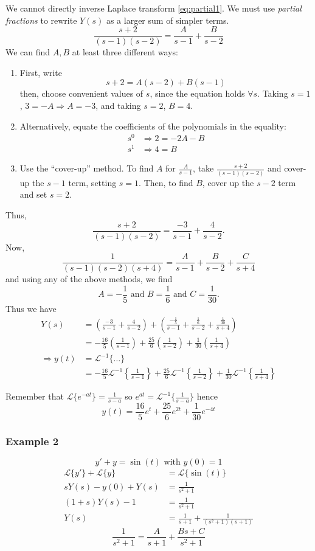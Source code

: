 \documentclass[11pt]{article}
\newcommand{\lap}{\mathcal{L}}
\newcommand{\lapi}{\lap^{-1}}
\begin{document}
	We cannot directly inverse Laplace transform \eqref{eq:partial1}. We must use \emph{partial fractions} to rewrite $Y(s)$ as a larger sum of simpler terms.
		$$ \frac{s+2}{(s-1)(s-2)} = \frac{A}{s-1} + \frac{B}{s-2} $$
	We can find $A,B$ at least three different ways:
		\begin{enumerate}
			\item First, write
				$$ s+2 = A(s-2) + B(s-1) $$
				then, choose convenient values of $s$, since the equation holds $\forall s$. Taking $s=1$, $3 = -A \Rightarrow A = -3$, and taking $s=2$, $B=4$.
			\item Alternatively, equate the coefficients of the polynomials in the equality:
				\begin{align*}
					s^0 &\Rightarrow 2 = -2 A - B \\
					s^1 &\Rightarrow 4 = B
				\end{align*}
			\item Use the ``cover-up'' method. To find $A$ for $\frac{A}{s-1}$, take $\frac{s+2}{(s-1)(s-2)}$ and cover-up the $s-1$ term, setting $s=1$. Then, to find $B$, cover up the $s-2$ term and set $s=2$.
		\end{enumerate}
	Thus,
		$$ \frac{s+2}{(s-1)(s-2)} = \frac{-3}{s-1} + \frac{4}{s-2}. $$
	Now,
		$$ \frac{1}{(s-1)(s-2)(s+4)} = \frac{A}{s-1} + \frac{B}{s-2} + \frac{C}{s+4} $$
	and using any of the above methods, we find
		$$ A = - \frac{1}{5} \text{ and } B = \frac{1}{6} \text{ and } C = \frac{1}{30} . $$
	Thus we have
		\begin{align*}
			Y(s) &= \left( \frac{-3}{s-1} + \frac{4}{s-2}\right) + \left(\frac{-\frac{1}{5}}{s-1} + \frac{\frac{1}{6}}{s-2} + \frac{\frac{1}{30}}{s+4}\right) \\
			&= - \frac{16}{5} \left(\frac{1}{s-1}\right) + \frac{25}{6} \left(\frac{1}{s-2}\right) + \frac{1}{30} \left(\frac{1}{s+4}\right) \\
			\Rightarrow y(t) &= \lapi\{\ldots\} \\
			&= - \frac{16}{5} \lapi \left\{\frac{1}{s-1}\right\} + \frac{25}{6} \lapi \left\{\frac{1}{s-2}\right\} + \frac{1}{30} \lapi \left\{\frac{1}{s+4}\right\}
		\end{align*}

	Remember that $\lap\{e^{-at}\} = \frac{1}{s-a}$ so $e^{at} = \lapi\{\frac{1}{s-a}\}$ hence
		$$ \boxed{y(t) = \frac{16}{5} e^t + \frac{25}{6} e^{2t} + \frac{1}{30} e^{-4t} } $$

\subsubsection{Example 2}
		$$ y' + y = \sin(t) \text{ with } y(0) = 1 $$
		\begin{align*}
			\lap\{y'\} + \lap\{y\} &= \lap\{\sin(t)\} \\
			sY(s) - y(0) + Y(s) &= \frac{1}{s^2 + 1} \\
			(1 + s)Y(s) - 1 &= \frac{1}{s^2 + 1} \\
			Y(s) &= \frac{1}{s+1} + \frac{1}{(s^2 + 1)(s+1)}
		\end{align*}
		$$ \frac{1}{s^2 + 1} = \frac{A}{s+1} + \frac{Bs+C}{s^2 + 1} $$
\end{document}
